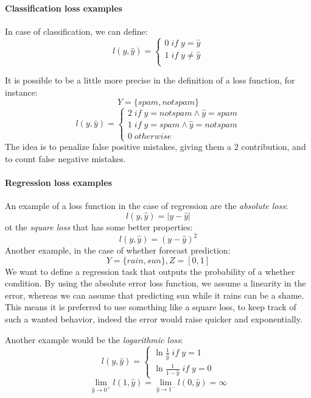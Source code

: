 \paragraph{Classification loss examples}
In case of classification, we can define:
\[
    l(y, \hat{y}) = \begin{cases}
        0\; \mathit{if}\; y = \hat{y}\\
        1\; \mathit{if}\; y \neq \hat{y}\\
\end{cases}\]

It is possible to be a little more precise in the definition of a loss function, for instance:
$$Y = \{\mathit{spam}, \mathit{notspam}\}$$
\[
    l(y, \hat{y}) = \begin{cases}
        2\; \mathit{if}\; y = \mathit{notspam} \wedge \hat{y} = \mathit{spam}\\
        1\; \mathit{if}\; y = \mathit{spam} \wedge \hat{y} = \mathit{notspam}\\
        0\; \mathit{otherwise}
\end{cases}\]
The idea is to penalize false positive mistakes, giving them a $2$ contribution, 
and to count false negative mistakes. 

\paragraph{Regression loss examples}
An example of a loss function in the case of regression are the \emph{absolute loss}:
$$l(y, \hat{y}) = |y - \hat{y}|$$
ot the \emph{square loss} that has some better properties:
$$l(y, \hat{y}) = (y - \hat{y})^2$$
Another example, in the case of whether forecast prediction:
$$Y = \{\mathit{rain}, \mathit{sun}\}, Z = [0,1]$$
We want to define a regression task that outputs the probability of a whether condition.
By using the absolute error loss function, we assume a linearity in the error, 
whereas we can assume that predicting sun while it rains can be a shame.\\
This means it is preferred to use something like a square loss, to keep track of such a 
wanted behavior, indeed the error would raise quicker and exponentially.

Another example would be the \emph{logarithmic loss}:
\[
    l(y, \hat{y}) = \begin{cases}
        \ln \frac{1}{\hat{y}}\; \mathit{if}\; y = 1\\
        \ln \frac{1}{1-\hat{y}}\; \mathit{if}\; y = 0
\end{cases}\]
$$\lim_{\hat{y} \rightarrow 0^+} l(1, \hat{y}) = \lim_{\hat{y} \rightarrow 1^-} l(0, \hat{y}) = \infty$$

